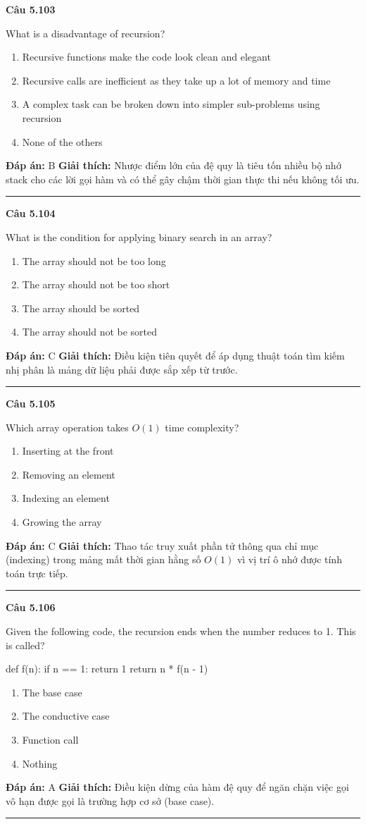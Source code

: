 \documentclass[11pt,a4paper]{article}
\newenvironment{question}[1]{%
  \par\vspace{1em}\noindent\textbf{\large Câu #1}\par\vspace{0.4em}
}{%
  \par\vspace{1em}\hrule\vspace{0.6em}
}
\newenvironment{choices}{%
  \begin{enumerate}[label=\textbf{\Alph*.},leftmargin=2.2em,itemsep=2pt,topsep=3pt]
}{%
  \end{enumerate}
}
\newcommand{\choice}{\item}
\newenvironment{codebox}{%
  \begin{tcolorbox}[colback=gray!8!white,colframe=gray!50!black,arc=1.5mm,boxrule=0.6pt,left=3mm,right=3mm,top=2.5mm,bottom=2.5mm]
  \ttfamily\small
}{%
  \end{tcolorbox}
}
\begin{document}
\begin{question}{5.103}
What is a disadvantage of recursion?
\begin{choices}
\choice Recursive functions make the code look clean and elegant
\choice Recursive calls are inefficient as they take up a lot of memory and time
\choice A complex task can be broken down into simpler sub-problems using recursion
\choice None of the others
\end{choices}
\textbf{Đáp án:} B
\textbf{Giải thích:} Nhược điểm lớn của đệ quy là tiêu tốn nhiều bộ nhớ stack cho các lời gọi hàm và có thể gây chậm thời gian thực thi nếu không tối ưu.
\end{question}

\begin{question}{5.104}
What is the condition for applying binary search in an array?
\begin{choices}
\choice The array should not be too long
\choice The array should not be too short
\choice The array should be sorted
\choice The array should not be sorted
\end{choices}
\textbf{Đáp án:} C
\textbf{Giải thích:} Điều kiện tiên quyết để áp dụng thuật toán tìm kiếm nhị phân là mảng dữ liệu phải được sắp xếp từ trước.
\end{question}

\begin{question}{5.105}
Which array operation takes $O(1)$ time complexity?
\begin{choices}
\choice Inserting at the front
\choice Removing an element
\choice Indexing an element
\choice Growing the array
\end{choices}
\textbf{Đáp án:} C
\textbf{Giải thích:} Thao tác truy xuất phần tử thông qua chỉ mục (indexing) trong mảng mất thời gian hằng số $O(1)$ vì vị trí ô nhớ được tính toán trực tiếp.
\end{question}

\begin{question}{5.106}
Given the following code, the recursion ends when the number reduces to 1. This is called?
\begin{codebox}
def f(n):
    if n == 1:
        return 1
    return n * f(n - 1)
\end{codebox}
\begin{choices}
\choice The base case
\choice The conductive case
\choice Function call
\choice Nothing
\end{choices}
\textbf{Đáp án:} A
\textbf{Giải thích:} Điều kiện dừng của hàm đệ quy để ngăn chặn việc gọi vô hạn được gọi là trường hợp cơ sở (base case).
\end{question}
\end{document}
